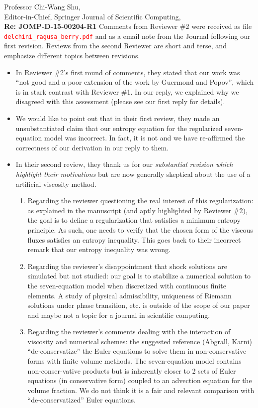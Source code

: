 \documentclass[11pt]{letter}
\newcommand{\tcr}[1]{\textcolor{red}{#1}}
\begin{document}
\begin{letter}{Professor Chi-Wang Shu, \\  Editor-in-Chief, Springer Journal of Scientific Computing,\\
\textbf{Re: JOMP-D-15-00204-R1}}
Comments from Reviewer \#2 were received as file \tcr{{\tt delchini\_ragusa\_berry.pdf}}
and as a email note from the Journal following our first revision. Reviews from the second Reviewer are short and terse,
and emphasize different topics between revisions.
\begin{itemize}
\item 
In Reviewer \#2's first round of comments, 
they stated that our work was ``not good and a poor extension of the work by Guermond and Popov'', which is in stark
contrast with Reviewer \#1. In our reply, we explained why we disagreed with this assessment (please see our first reply for details). 
\item We would like to point out that in their first review, they made an unsubstantiated  claim that our entropy equation for the 
regularized seven-equation model was incorrect. In fact, it is not and we have re-affirmed the correctness of our derivation in our reply to them. 
\item In their second review, they thank us for our {\it substantial revision which highlight their motivations} but are now generally skeptical about the use of a artificial viscosity method. 
\begin{enumerate}
\item Regarding the reviewer questioning the real interest of this regularization: as explained 
in the manuscript (and aptly highlighted by Reviewer \#2),  the goal is to define a regularization 
that satisfies a minimum entropy principle. As such, one needs to verify that the chosen form of the viscous fluxes satisfies an entropy inequality. This goes back to their incorrect remark that our entropy inequality was wrong. 
\item Regarding the reviewer's disappointment that shock solutions are simulated but not studied: our goal is to stabilize a numerical solution to the seven-equation model when discretized with continuous finite elements. A study of physical admissibility, uniqueness of Riemann solutions under phase transition, etc. is outside of the scope of our paper and maybe not a topic for a journal in scientific computing. 
\item Regarding the reviewer's comments dealing with the interaction of viscosity and numerical schemes: the suggested reference (Abgrall, Karni) ``de-conservatize'' the Euler equations to solve them in non-conservative forms with finite volume methods. The seven-equation model contains non-conser-vative products but is inherently closer to 2 sets of Euler equations (in conservative form) coupled to an advection equation for the volume fraction. We do not think it is a fair and relevant comparison with ``de-conservatized'' Euler equations. 

\end{enumerate}
\end{itemize}
\end{letter}
\end{document}
